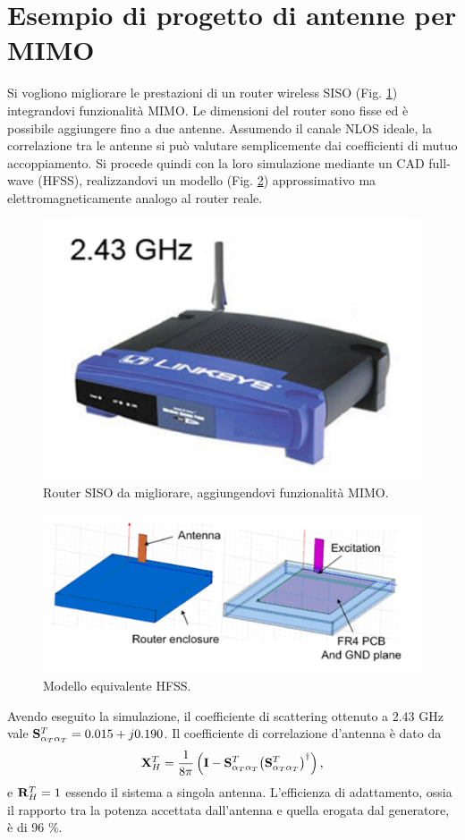 \documentclass[technote]{IEEEtran}
\begin{document}
\section{Esempio di progetto di antenne per MIMO}

\par Si vogliono migliorare le prestazioni di un router wireless SISO (Fig. \ref{fig:27}) integrandovi funzionalità MIMO. Le dimensioni del router sono fisse ed è possibile aggiungere fino a due antenne. Assumendo il canale NLOS ideale, la correlazione tra le antenne si può valutare semplicemente dai coefficienti di mutuo accoppiamento. Si procede quindi con la loro simulazione mediante un CAD full-wave (HFSS\texttrademark), realizzandovi un modello (Fig. \ref{fig:28}) approssimativo ma elettromagneticamente analogo al router reale.

\begin{figure}[!ht]
\centering
\includegraphics[width=.5\columnwidth]{figure27}
\caption{Router SISO da migliorare, aggiungendovi funzionalità MIMO.}
\label{fig:27}
\end{figure}
\begin{figure}[!ht]
\centering
\includegraphics[width=.9\columnwidth]{figure28}
\caption{Modello equivalente HFSS.}
\label{fig:28}
\end{figure}

\par Avendo eseguito la simulazione, il coefficiente di scattering ottenuto a 2.43 GHz vale ${\bf{S}}_{{\alpha _T}{\alpha _T}}^{T} = 0.015 + j0.190$. Il coefficiente di correlazione d'antenna è dato da $${\bf{X}}_H^T = \frac{1}{{8\pi }}\left( {{\bf{I}} - {\bf{S}}_{{\alpha _T}{\alpha _T}}^T {{\left( {{\bf{S}}_{{\alpha _T}{\alpha _T}}^T} \right)}^\dagger}} \right),$$ e ${\bf{R}}_H^T = 1$ essendo il sistema a singola antenna. L'efficienza di adattamento, ossia il rapporto tra la potenza accettata dall'antenna e quella erogata dal generatore, è di 96 \%.                                             
\end{document}
